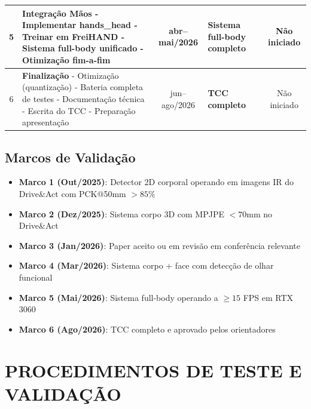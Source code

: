\documentclass[12pt, a4paper]{article}
\begin{document}
\begin{table}[H]
\begin{tabular}{|c|p{5.5cm}|c|p{2.8cm}|c|}
        5 & \textbf{Integração Mãos}
        \newline - Implementar hands\_head
        \newline - Treinar em FreiHAND
        \newline - Sistema full-body unificado
        \newline - Otimização fim-a-fim &
        abr--mai/2026 &
        Sistema full-body completo &
        Não iniciado \\ \hline
        
        6 & \textbf{Finalização}
        \newline - Otimização (quantização)
        \newline - Bateria completa de testes
        \newline - Documentação técnica
        \newline - Escrita do TCC
        \newline - Preparação apresentação &
        jun--ago/2026 &
        \textbf{TCC completo} &
        Não iniciado \\ \hline
    \end{tabular}
\end{table}

\subsection{Marcos de Validação}

\begin{itemize}
    \item \textbf{Marco 1 (Out/2025)}: Detector 2D corporal operando em imagens IR do Drive\&Act com PCK@50mm $> 85\%$
    \item \textbf{Marco 2 (Dez/2025)}: Sistema corpo 3D com MPJPE $< 70$mm no Drive\&Act
    \item \textbf{Marco 3 (Jan/2026)}: Paper aceito ou em revisão em conferência relevante
    \item \textbf{Marco 4 (Mar/2026)}: Sistema corpo + face com detecção de olhar funcional
    \item \textbf{Marco 5 (Mai/2026)}: Sistema full-body operando a $\geq 15$ FPS em RTX 3060
    \item \textbf{Marco 6 (Ago/2026)}: TCC completo e aprovado pelos orientadores
\end{itemize}

\section{PROCEDIMENTOS DE TESTE E VALIDAÇÃO}
\end{document}
